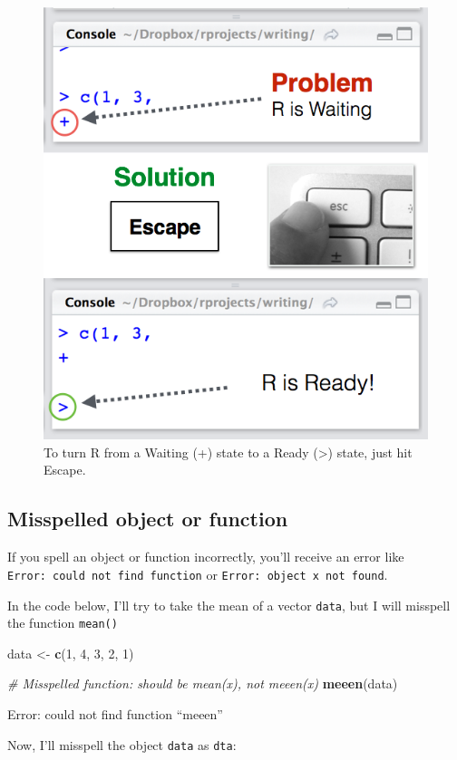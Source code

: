 \documentclass[]{book}
\newenvironment{Shaded}{\begin{snugshade}}{\end{snugshade}}
\newcommand{\KeywordTok}[1]{\textcolor[rgb]{0.13,0.29,0.53}{\textbf{#1}}}
\newcommand{\DecValTok}[1]{\textcolor[rgb]{0.00,0.00,0.81}{#1}}
\newcommand{\StringTok}[1]{\textcolor[rgb]{0.31,0.60,0.02}{#1}}
\newcommand{\CommentTok}[1]{\textcolor[rgb]{0.56,0.35,0.01}{\textit{#1}}}
\newcommand{\NormalTok}[1]{#1}
\theoremstyle{definition}
\theoremstyle{definition}
\theoremstyle{remark}
\begin{document}
\begin{figure}

{\centering \includegraphics[width=0.5\linewidth]{images/escapesolution} 

}

\caption{To turn R from a Waiting (+) state to a Ready (>) state, just hit Escape.}\label{fig:rstate}
\end{figure}

\subsection{Misspelled object or
function}\label{misspelled-object-or-function}

If you spell an object or function incorrectly, you'll receive an error
like \texttt{Error:\ could\ not\ find\ function} or
\texttt{Error:\ object\ \textquotesingle{}x\textquotesingle{}\ not\ found}.

In the code below, I'll try to take the mean of a vector \texttt{data},
but I will misspell the function \texttt{mean()}

\begin{Shaded}
\begin{Highlighting}[]
\NormalTok{data <-}\StringTok{ }\KeywordTok{c}\NormalTok{(}\DecValTok{1}\NormalTok{, }\DecValTok{4}\NormalTok{, }\DecValTok{3}\NormalTok{, }\DecValTok{2}\NormalTok{, }\DecValTok{1}\NormalTok{)}

\CommentTok{# Misspelled function: should be mean(x), not meeen(x)}
\KeywordTok{meeen}\NormalTok{(data)}
\end{Highlighting}
\end{Shaded}

Error: could not find function ``meeen''

Now, I'll misspell the object \texttt{data} as \texttt{dta}:
\end{document}
